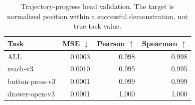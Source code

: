 \begin{table}[t]
\centering
\caption{Trajectory-progress head validation. The target is normalized position within a successful demonstration, not true task value.}
\label{tab:progress-head-validation}
\begin{tabular}{lrrr}
\toprule
Task & MSE $\downarrow$ & Pearson $\uparrow$ & Spearman $\uparrow$ \\
\midrule
ALL & 0.0003 & 0.998 & 0.998 \\
reach-v3 & 0.0010 & 0.995 & 0.995 \\
button-press-v3 & 0.0001 & 0.999 & 0.999 \\
drawer-open-v3 & 0.0001 & 1.000 & 1.000 \\
\bottomrule
\end{tabular}
\end{table}
